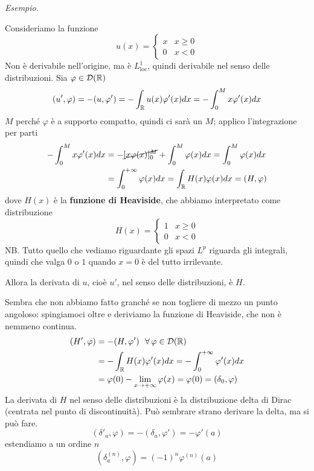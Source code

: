 \textit{Esempio.}

Consideriamo la funzione
\begin{equation*}
u(x) =
\begin{cases}
x & x\geq 0\\
0 & x < 0
\end{cases}
\end{equation*}
Non è derivabile nell'origine, ma è $L^{1}_{\mathrm{loc}}$, quindi derivabile nel senso delle distribuzioni. Sia $\varphi \in \mathcal{D}(\mathbb{R})$
\begin{equation*}
(u', \varphi) = - (u, \varphi') = - \int_{\mathbb{R}} u(x) \varphi'(x) dx = - \int^{M}_{0} x\varphi'(x) dx
\end{equation*}
$M$ perché $\varphi $ è a supporto compatto, quindi ci sarà un $M$; applico l'integrazione per parti
\begin{align*}
- \int^{M}_{0} x\varphi'(x) dx & = - \cancel{[x\varphi (x)]^{M}_{0}} + \int^{M}_{0} \varphi (x) dx = \int^{M}_{0} \varphi (x) dx\\
 & = \int^{+ \infty}_{0} \varphi (x) dx = \int_{\mathbb{R}} H(x) \varphi (x) dx = (H, \varphi)
\end{align*}
dove $H(x)$ è la \textbf{funzione di Heaviside}, che abbiamo interpretato come distribuzione
\begin{equation*}
H(x) =
\begin{cases}
1 & x\geq 0\\
0 & x < 0
\end{cases}
\end{equation*}
NB. Tutto quello che vediamo riguardante gli spazi $L^{p}$ riguarda gli integrali, quindi che valga $0$ o $1$ quando $x = 0$ è del tutto irrilevante.

Allora la derivata di $u$, cioè $u'$, nel senso delle distribuzioni, è $H$.

Sembra che non abbiamo fatto granché se non togliere di mezzo un punto angoloso: spingiamoci oltre e deriviamo la funzione di Heaviside, che non è nemmeno continua.
\begin{align*}
(H', \varphi) & = - (H, \varphi') \ \ \forall \varphi \in \Dc(\RR)\\
 & = - \int_{\RR} H(x) \varphi'(x) dx = - \int^{+ \infty}_{0} \varphi'(x) dx\\
 & = \varphi (0) - \lim_{x\rightarrow + \infty} \varphi (x) = \varphi (0) = (\delta_{0}, \varphi)
\end{align*}
La derivata di $H$ nel senso delle distribuzioni è la distribuzione delta di Dirac (centrata nel punto di discontinuità). Può sembrare strano derivare la delta, ma si può fare.
\begin{equation*}
(\delta'_{a}, \varphi) = - (\delta_{a}, \varphi') = - \varphi'(a)
\end{equation*}
estendiamo a un ordine $n$
\begin{equation*}
\left(\delta^{(n)}_{a}, \varphi \right) = (- 1)^{n} \varphi^{(n)}(a)
\end{equation*}

